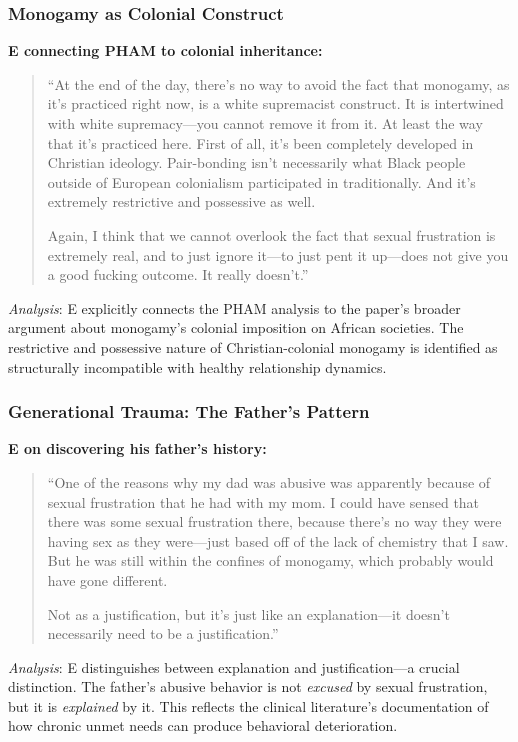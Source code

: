 \documentclass[12pt, letterpaper]{article}
\begin{document}
\subsubsection{Monogamy as Colonial Construct}

\textbf{E connecting PHAM to colonial inheritance:}
\begin{quote}
``At the end of the day, there's no way to avoid the fact that monogamy, as it's practiced right now, is a white supremacist construct. It is intertwined with white supremacy---you cannot remove it from it. At least the way that it's practiced here. First of all, it's been completely developed in Christian ideology. Pair-bonding isn't necessarily what Black people outside of European colonialism participated in traditionally. And it's extremely restrictive and possessive as well.

Again, I think that we cannot overlook the fact that sexual frustration is extremely real, and to just ignore it---to just pent it up---does not give you a good fucking outcome. It really doesn't.''
\end{quote}

\textit{Analysis}: E explicitly connects the PHAM analysis to the paper's broader argument about monogamy's colonial imposition on African societies. The restrictive and possessive nature of Christian-colonial monogamy is identified as structurally incompatible with healthy relationship dynamics.

\subsubsection{Generational Trauma: The Father's Pattern}

\textbf{E on discovering his father's history:}
\begin{quote}
``One of the reasons why my dad was abusive was apparently because of sexual frustration that he had with my mom. I could have sensed that there was some sexual frustration there, because there's no way they were having sex as they were---just based off of the lack of chemistry that I saw. But he was still within the confines of monogamy, which probably would have gone different.

Not as a justification, but it's just like an explanation---it doesn't necessarily need to be a justification.''
\end{quote}

\textit{Analysis}: E distinguishes between explanation and justification---a crucial distinction. The father's abusive behavior is not \textit{excused} by sexual frustration, but it is \textit{explained} by it. This reflects the clinical literature's documentation of how chronic unmet needs can produce behavioral deterioration.
\end{document}
